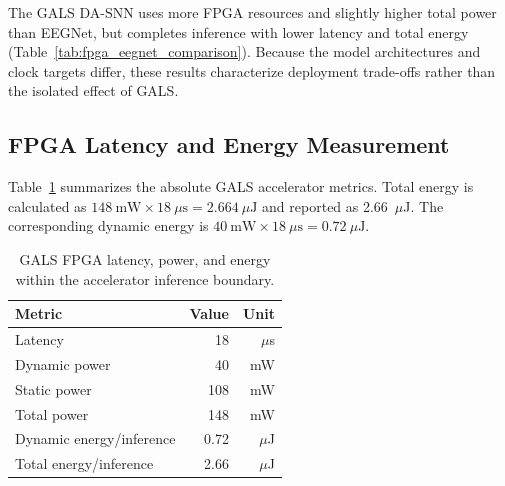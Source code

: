 ﻿\documentclass[12pt]{article}
\begin{document}
The GALS DA-SNN uses more FPGA resources and slightly higher total power than EEGNet, but completes inference with lower latency and total energy (Table~\ref{tab:fpga_eegnet_comparison}). Because the model architectures and clock targets differ, these results characterize deployment trade-offs rather than the isolated effect of GALS.

\subsection{FPGA Latency and Energy Measurement}

Table~\ref{tab:power_comparison} summarizes the absolute GALS accelerator metrics. Total energy is calculated as $148~\mathrm{mW}\times18~\mu\mathrm{s}=2.664~\mu\mathrm{J}$ and reported as 2.66~$\mu$J. The corresponding dynamic energy is $40~\mathrm{mW}\times18~\mu\mathrm{s}=0.72~\mu\mathrm{J}$.

\begin{table}[!htbp]
\centering
\caption{GALS FPGA latency, power, and energy within the accelerator inference boundary.}
\label{tab:power_comparison}
\footnotesize
\renewcommand{\arraystretch}{1.2}
\setlength{\tabcolsep}{4pt}
\begin{tabular}{@{}lrr@{}}
\toprule
Metric & Value & Unit \\
\midrule
Latency & 18 & $\mu$s \\
Dynamic power & 40 & mW \\
Static power & 108 & mW \\
Total power & 148 & mW \\
Dynamic energy/inference & 0.72 & $\mu$J \\
Total energy/inference & 2.66 & $\mu$J \\
\bottomrule
\end{tabular}
\end{table}
\end{document}
